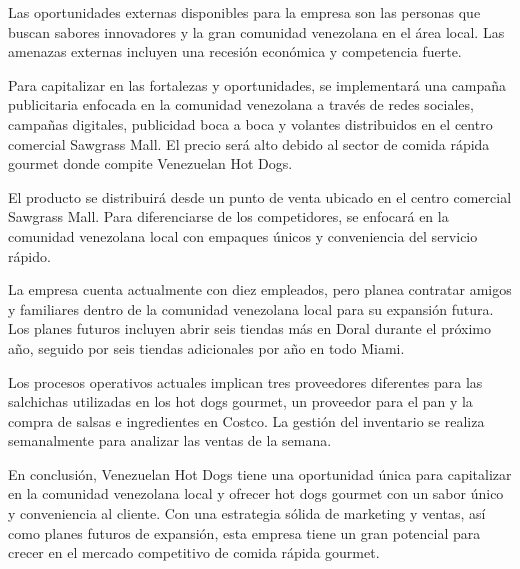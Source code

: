 Las oportunidades externas disponibles para la empresa son las personas que buscan sabores innovadores y la gran comunidad venezolana en el área local. Las amenazas externas incluyen una recesión económica y competencia fuerte.

Para capitalizar en las fortalezas y oportunidades, se implementará una campaña publicitaria enfocada en la comunidad venezolana a través de redes sociales, campañas digitales, publicidad boca a boca y volantes distribuidos en el centro comercial Sawgrass Mall. El precio será alto debido al sector de comida rápida gourmet donde compite Venezuelan Hot Dogs.

El producto se distribuirá desde un punto de venta ubicado en el centro comercial Sawgrass Mall. Para diferenciarse de los competidores, se enfocará en la comunidad venezolana local con empaques únicos y conveniencia del servicio rápido.

La empresa cuenta actualmente con diez empleados, pero planea contratar amigos y familiares dentro de la comunidad venezolana local para su expansión futura. Los planes futuros incluyen abrir seis tiendas más en Doral durante el próximo año, seguido por seis tiendas adicionales por año en todo Miami.

Los procesos operativos actuales implican tres proveedores diferentes para las salchichas utilizadas en los hot dogs gourmet, un proveedor para el pan y la compra de salsas e ingredientes en Costco. La gestión del inventario se realiza semanalmente para analizar las ventas de la semana.

En conclusión, Venezuelan Hot Dogs tiene una oportunidad única para capitalizar en la comunidad venezolana local y ofrecer hot dogs gourmet con un sabor único y conveniencia al cliente. Con una estrategia sólida de marketing y ventas, así como planes futuros de expansión, esta empresa tiene un gran potencial para crecer en el mercado competitivo de comida rápida gourmet.